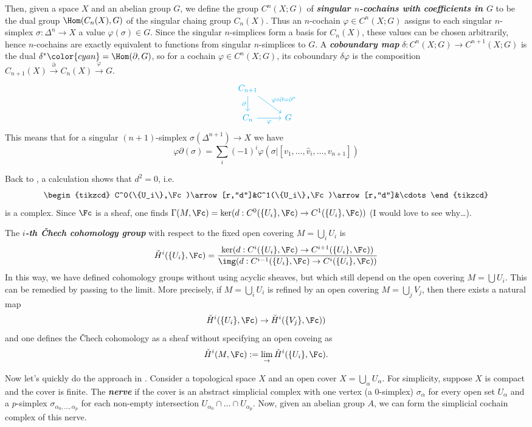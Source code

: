 \begin{remark}
	Then, given a space $X$ and an abelian group $G$, we define the group $C^n(X;G)$ of \textbf{\textit{singular $n$-cochains with coefficients in $G$}} to be the dual group $\Hom(C_n(X),G)$ of the singular chaing group $C_n(X)$. Thus an $n$-cochain $\varphi\in C^n(X;G)$ assigns to each singular $n$-simplex $\sigma:\Delta^n\to X$ a value $\varphi(\sigma)\in G$. Since the singular $n$-simplices form a basis for $C_n(X)$, these values can be chosen arbitrarily, hence $n$-cochains are exactly equivalent to functions from singular $n$-simplices to $G$. A \textbf{\textit{coboundary map}} $\delta:C^n(X;G)\to C^{n+1}(X;G)$ is the dual $\delta^*{\color{cyan}=\Hom(\partial,G)}$, so for a cochain $\varphi\in C^n(X;G)$, its coboundary $\delta\varphi$ is the composition $C_{n+1}(X)\overset{\partial}{\to}C_n(X)\overset{\varphi}{\to}G$.
		\[\begin{tikzcd}
		\textcolor{cyan}{C_{n+1}}\arrow[d,cyan,swap,"\partial"]\arrow[rd,cyan,"\varphi\circ\partial=\partial^*"]\\	\textcolor{cyan}{C_n}\arrow[cyan,swap,r,"\varphi"]&\textcolor{cyan}{G}
	\end{tikzcd}\]
	This means that for a singular $(n+1)$-simplex $\sigma(\Delta^{n+1})\to X$ we have
	\[\varphi\partial (\sigma)=\sum_i(-1)^i\varphi(\sigma|[v_1,\ldots,\widehat{v}_i,\ldots,v_{n+1}])\]
\end{remark}

Back to \cite{huybrechts}, a calculation shows that $d^2=0$, i.e.
\[\begin{tikzcd}
	C^0(\{U_i\},\Fc)\arrow[r,"d"]&C^1(\{U_i\},\Fc)\arrow[r,"d"]&\cdots
\end{tikzcd}\]
is a complex. {\color{magenta}Since $\Fc$ is a sheaf, one finds $\Gamma(M,\Fc)=\ker(d:C^0(\{U_i\},\Fc)\to C^1(\{U_i\},\Fc))$ (I would love to see why…)}.

\begin{defn}
	The \textbf{\textit{$i$-th \v Chech cohomology group}} with respect to the fixed open covering $M=\bigcup_iU_i$ is
	\[\check{H}^i(\{U_i\},\Fc)=\dfrac{\ker(d:C^i(\{U_i\},\Fc)\to C^{i+1}(\{U_i\},\Fc))}{\img(d:C^{i-1}(\{U_i\},\Fc)\to C^i(\{U_i\},\Fc))}\]
	In this way, we have defined cohomology groups without using acyclic sheaves, but which still depend on the open covering $M=\bigcup U_i$. This can be remedied by passing to the limit. More precisely, if $M=\bigcup_i U_i$ is refined by an open covering $M=\bigcup_jV_j$, then there exists a natural map
	\[\check{H}^i(\{U_i\},\Fc)\to\check{H}^i(\{V_j\},\Fc))\]
	and one defines the \v Chech cohomology as a sheaf without specifying an open coveing as
	\[\check{H}^i(M,\Fc):=\lim_\to \check{H}^i(\{U_i\},\Fc).\]
\end{defn}
Now let's quickly do the approach in \cite{donaldson}.
Consider a topological space $X$ and an open cover $X=\bigcup_\alpha U_\alpha$. For simplicity, suppose $X$ is compact and the cover is finite. The \textbf{\textit{nerve}} if the cover is an abstract simplicial complex with one vertex (a 0-simplex) $\sigma_\alpha$ for every open set $U_\alpha$ and a $p$-simplex $\sigma_{\alpha_0,\ldots,\alpha_p}$ for each non-empty intersection $U_{\alpha_0}\cap\ldots\cap U_{\alpha_p}$. Now, given an abelian group $A$, we can form the simplicial cochain complex of this nerve.

